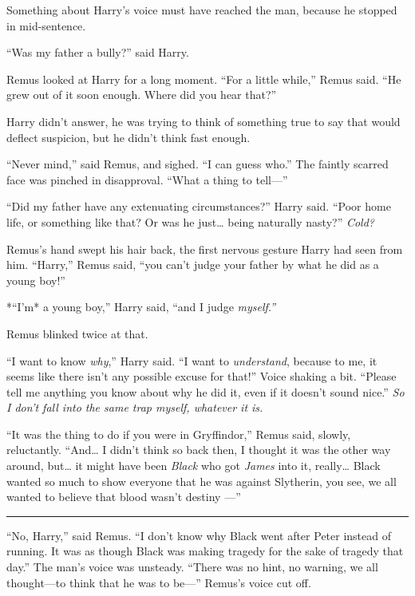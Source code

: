 Something about Harry's voice must have reached the man, because he
stopped in mid-sentence.

``Was my father a bully?'' said Harry.

Remus looked at Harry for a long moment. ``For a little while,'' Remus
said. ``He grew out of it soon enough. Where did you hear that?''

Harry didn't answer, he was trying to think of something true to say
that would deflect suspicion, but he didn't think fast enough.

``Never mind,'' said Remus, and sighed. ``I can guess who.'' The faintly
scarred face was pinched in disapproval. ``What a thing to tell---''

``Did my father have any extenuating circumstances?'' Harry said. ``Poor
home life, or something like that? Or was he just\ldots{} being
naturally nasty?'' \emph{Cold?}

Remus's hand swept his hair back, the first nervous gesture Harry had
seen from him. ``Harry,'' Remus said, ``you can't judge your father by
what he did as a young boy!''

*``I'm* a young boy,'' Harry said, ``and I judge \emph{myself.''}

Remus blinked twice at that.

``I want to know \emph{why},'' Harry said. ``I want to
\emph{understand}, because to me, it seems like there isn't any possible
excuse for that!'' Voice shaking a bit. ``Please tell me anything you
know about why he did it, even if it doesn't sound nice.'' \emph{So I
don't fall into the same trap myself, whatever it is.}

``It was the thing to do if you were in Gryffindor,'' Remus said,
slowly, reluctantly. ``And\ldots{} I didn't think so back then, I
thought it was the other way around, but\ldots{} it might have been
\emph{Black} who got \emph{James} into it, really\ldots{} Black wanted
so much to show everyone that he was against Slytherin, you see, we all
wanted to believe that blood wasn't destiny ---''

\begin{center}\rule{3in}{0.4pt}\end{center}

``No, Harry,'' said Remus. ``I don't know why Black went after Peter
instead of running. It was as though Black was making tragedy for the
sake of tragedy that day.'' The man's voice was unsteady. ``There was no
hint, no warning, we all thought---to think that he was to be---''
Remus's voice cut off.

